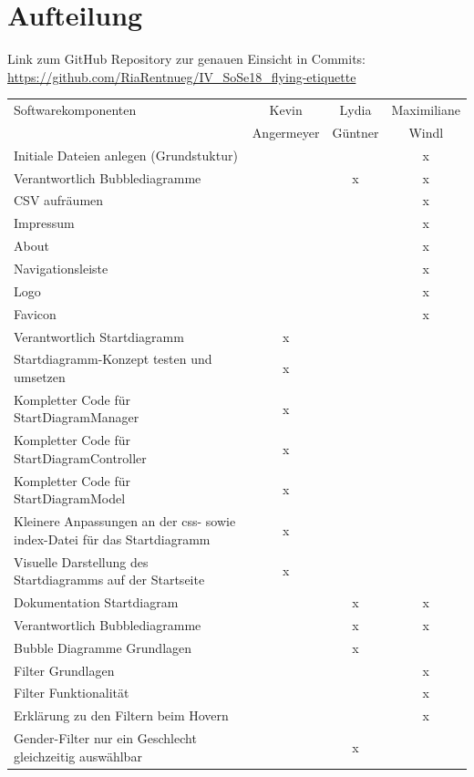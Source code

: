 \documentclass{mi-seminar}
\begin{document}
\section{Aufteilung}
Link zum GitHub Repository zur genauen Einsicht in Commits: \newline
\href{https://github.com/RiaRentnueg/IV_SoSe18_flying-etiquette}{https://github.com/RiaRentnueg/IV\_SoSe18\_flying-etiquette}
\linebreak \newline
{}
\begin{longtable}{p{5cm} | c | c | c}
Softwarekomponenten & Kevin & Lydia & Maximiliane \\
 & Angermeyer & Güntner & Windl \\
\hline
\endhead
Initiale Dateien anlegen (Grundstuktur)& & & x \\
Verantwortlich Bubblediagramme & & x & x \\
CSV aufräumen & & & x \\
Impressum & & & x\\
About & & & x\\
Navigationsleiste & & & x\\
Logo & & & x \\
Favicon & & & x \\
Verantwortlich Startdiagramm & x & & \\
Startdiagramm-Konzept testen und umsetzen & x & & \\
Kompletter Code für StartDiagramManager & x & & \\
Kompletter Code für StartDiagramController & x & & \\
Kompletter Code für StartDiagramModel & x & & \\
Kleinere Anpassungen an der css- sowie index-Datei für das Startdiagramm & x & & \\
Visuelle Darstellung des Startdiagramms auf der Startseite & x & & \\
Dokumentation Startdiagram & & x & x\\
Verantwortlich Bubblediagramme & & x & x \\
Bubble Diagramme Grundlagen & & x & \\
Filter Grundlagen & & & x \\
Filter Funktionalität & & & x \\
Erklärung zu den Filtern beim Hovern & & & x \\
Gender-Filter nur ein Geschlecht gleichzeitig auswählbar & & x & \\

\end{longtable}
\end{document}
